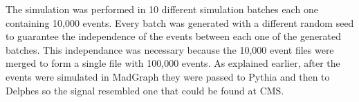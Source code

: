 The simulation was performed in 10 different simulation batches each one containing 10,000 events. Every batch was generated with a different random seed to guarantee the independence of the events between each one of the generated batches. This independance was necessary because the 10,000 event files were merged to form a single file with 100,000 events. As explained earlier, after the events were simulated in MadGraph they were passed to Pythia and then to Delphes so the signal resembled one that could be found at CMS.  

